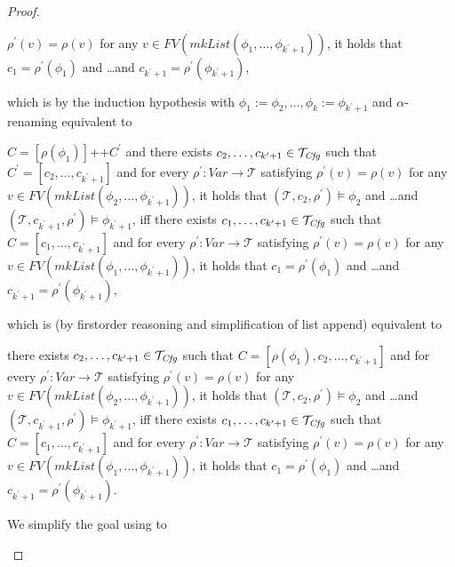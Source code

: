 \begin{proof}
\begin{itemize}
\begin{proofenv}
    $\rho^\prime(v) = \rho(v)$ for any
    $v \in \mathit{FV}(\mathit{mkList}(\phi_1, \ldots, \phi_{k^\prime + 1}))$,
    it holds that
    $c_1 = \rho^\prime(\phi_1)$ and \ldots and $c_{k^\prime + 1} = \rho^\prime(\phi_{k^\prime + 1})$,
    \end{proofenv}
    which is by the induction hypothesis with $\phi_1 := \phi_2,\ldots,\phi_k := \phi_{k^\prime + 1}$
    and $\alpha$-renaming
    equivalent to
    \begin{proofenv}
    $C = [\rho(\phi_1)] \texttt{++} C^\prime$ and
    there exists $c_2, \ldots, c_{k^\prime + 1} \in \mathcal{T}_{\mathit{Cfg}}$ such that $C^\prime = [c_2, \ldots, c_{k^\prime+1}]$ 
    and for every $\rho^\prime : \mathit{Var} \to \mathcal{T}$ satisfying
    $\rho^\prime(v) = \rho(v)$ for any
    $v \in \mathit{FV}(\mathit{mkList}(\phi_2, \ldots, \phi_{k^\prime+1}))$,
    it holds that
    $(\mathcal{T}, c_2, \rho^\prime) \vDash \phi_2$ and \ldots and $(\mathcal{T}, c_{k^\prime+1}, \rho^\prime) \vDash \phi_{k^\prime + 1}$,
    iff there exists $c_1, \ldots, c_{k^\prime + 1} \in \mathcal{T}_{\mathit{Cfg}}$ such that $C = [c_1, \ldots, c_{k^\prime + 1}]$
    and for every $\rho^\prime : \mathit{Var} \to \mathcal{T}$ satisfying
    $\rho^\prime(v) = \rho(v)$ for any
    $v \in \mathit{FV}(\mathit{mkList}(\phi_1, \ldots, \phi_{k^\prime + 1}))$,
    it holds that
    $c_1 = \rho^\prime(\phi_1)$ and \ldots and $c_{k^\prime + 1} = \rho^\prime(\phi_{k^\prime + 1})$,
    \end{proofenv}
    which is (by firstorder reasoning and simplification of list append) equivalent to
    \begin{proofenv}
    there exists $c_2, \ldots, c_{k^\prime + 1} \in \mathcal{T}_{\mathit{Cfg}}$ such that
    $C = [\rho(\phi_1), c_2, \ldots, c_{k^\prime+1}]$
    and for every $\rho^\prime : \mathit{Var} \to \mathcal{T}$ satisfying
    $\rho^\prime(v) = \rho(v)$ for any
    $v \in \mathit{FV}(\mathit{mkList}(\phi_2, \ldots, \phi_{k^\prime+1}))$,
    it holds that
    $(\mathcal{T}, c_2, \rho^\prime) \vDash \phi_2$ and \ldots and $(\mathcal{T}, c_{k^\prime+1}, \rho^\prime) \vDash \phi_{k^\prime+1}$,
    iff there exists $c_1, \ldots, c_{k^\prime + 1} \in \mathcal{T}_{\mathit{Cfg}}$ such that $C = [c_1, \ldots, c_{k^\prime + 1}]$
    and for every $\rho^\prime : \mathit{Var} \to \mathcal{T}$ satisfying
    $\rho^\prime(v) = \rho(v)$ for any
    $v \in \mathit{FV}(\mathit{mkList}(\phi_1, \ldots, \phi_{k^\prime + 1}))$,
    it holds that
    $c_1 = \rho^\prime(\phi_1)$ and \ldots and $c_{k^\prime + 1} = \rho^\prime(\phi_{k^\prime + 1})$.
    \end{proofenv}
    We simplify the goal using  to

\end{itemize}
\end{proof}
